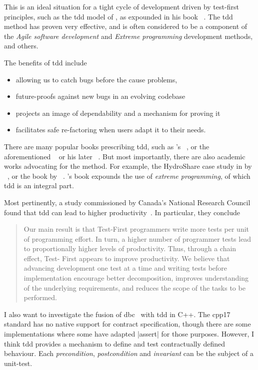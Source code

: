 This is an ideal situation for a tight cycle of development driven by test-first
principles, such as the \acf{tdd} model of \citeauthor{Beck2003}, as expounded
in his \citeyear{Beck2003} book ~\cite{Beck2003}. The
\ac{tdd} method has proven very effective, and is often considered to be a
component of the \emph{Agile software development} and \emph{Extreme
programming} development methods, and others.

The benefits of \ac{tdd} include
%
\begin{itemize}
  \item allowing us to catch bugs before the cause problems,
  \item future-proofs against new bugs in an evolving codebase
  \item projects an image of dependability and a mechanism for proving it
  \item facilitates safe re-factoring when users adapt it to their needs.
\end{itemize}

There are many popular books prescribing \ac{tdd}, such as
\citeauthor{Martin2009}'s ~\cite{Martin2009}, or the
aforementioned \citeauthor{Beck2003}~\cite{Beck2003} or his later
~\cite{Beck2007}. But most importantly, there are also
academic works advocating for the method. For example, the HydroShare case study
in  by \citeauthor{Carver2016}~\cite{Carver2016}, or the
book  by \citeauthor{Kandt2006}~\cite{Kandt2006}.
\citeauthor{Kandt2006}'s book expounds the use of \emph{extreme programming}, of
which \ac{tdd} is an integral part.

Most pertinently, a  study commissioned by Canada's National Research
Council found that \ac{tdd} can lead to higher productivity~\cite{Erdogmus2005}.
In particular, they conclude
%
\begin{quote}
  Our main result is that Test-First programmers write more tests per unit of
  programming effort. In turn, a higher number of programmer tests lead to
  proportionally higher levels of productivity. Thus, through a chain effect,
  Test- First appears to improve productivity. We believe that advancing
  development one test at a time and writing tests before implementation
  encourage better decomposition, improves understanding of the underlying
  requirements, and reduces the scope of the tasks to be performed.
\end{quote}

I also want to investigate the fusion of \acf{dbc}~\cite{Meyer1992} with
\ac{tdd} in C++. The \ac{cpp17} standard has no native support for contract
specification, though there are some implementations where some have adapted
|assert| for those purposes. However, I think \ac{tdd} provides a mechanism to
define and test contractually defined behaviour. Each \emph{precondition},
\emph{postcondition} and \emph{invariant} can be the subject of a unit-test.
